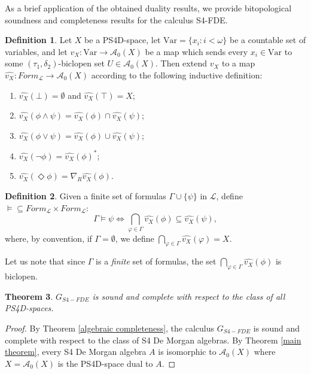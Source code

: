 \documentclass{amsart}
\theoremstyle{plain}
\newtheorem{theorem}{Theorem}[section]
\newcommand{\alg}[1]{{\ensuremath{\boldsymbol {\mathit{#1}}}}}
\theoremstyle{definition}
\newtheorem{definition}[theorem]{Definition}
\begin{document}
As a brief application of the obtained duality results, we provide bitopological soundness and completeness results for the calculus S4-FDE. 
\begin{definition}
    Let $X$ be a PS4D-space, let $\text{Var}=\{x_i:i<\omega\}$ be a countable set of variables, and let $v_X\colon\text{Var}\to\mathcal{A}_0(X)$ be a map which sends every $x_i\in\text{Var}$ to some $(\tau_1,\delta_2)$-biclopen set $U\in\mathcal{A}_0(X)$. Then extend $v_X$ to a map $\widehat{v_X}\colon \mathit{Form}_{\mathcal{L}}\to\mathcal{A}_0(X)$ according to the following inductive definition: 
    \begin{enumerate}
        \item $\widehat{v_X}(\bot)=\emptyset$ and $\widehat{v_X}(\top)=X$; 
        \item $\widehat{v_X}(\phi\wedge\psi)=\widehat{v_X}(\phi)\cap\widehat{v_X}(\psi)$; 
        \item $\widehat{v_X}(\phi\vee\psi)=\widehat{v_X}(\phi)\cup\widehat{v_X}(\psi)$; 
        \item $\widehat{v_X}(\neg\phi)=\widehat{v_X}(\phi)^*$; 
        \item $\widehat{v_X}(\Diamond \phi)=\nabla_R\widehat{v_X}(\phi).$
    \end{enumerate}
\end{definition}
\begin{definition}
    Given a finite set of formulas $\Gamma \cup\{\psi\}$ in $\mathcal{L}$, define $\models\subseteq\mathit{Form}_{\mathcal{L}} \times \mathit{Form}_{\mathcal{L}} $: 
    \[\Gamma\models\psi\Longleftrightarrow \bigcap_{\varphi \in \Gamma}\widehat{v_X}(\phi)\subseteq\widehat{v_X}(\psi),\]
    where, by convention, if $\Gamma = \emptyset$, we define $\bigcap_{\varphi \in \Gamma} \widehat{v_X}(\varphi)=X$.
\end{definition}
Let us note that since $\Gamma$ is a \emph{finite} set of formulas, the set $\bigcap_{\varphi \in \Gamma}\widehat{v_X}(\phi)$ is biclopen.

\begin{theorem}
    $G_{S4-FDE}$ is sound and complete with respect to the class of all PS4D-spaces. 
\end{theorem}
\begin{proof}
    By Theorem \ref{algebraic completeness}, the calculus $G_{S4-FDE}$ is sound and complete with respect to the class of S4 De Morgan algebras. By Theorem \ref{main theorem}, every S4 De Morgan algebra $\alg A$ is isomorphic to $\mathcal{A}_0(X)$ where $X=\mathcal{A}_0(X)$ is the PS4D-space dual to $\alg A$.
\end{proof}
\end{document}
